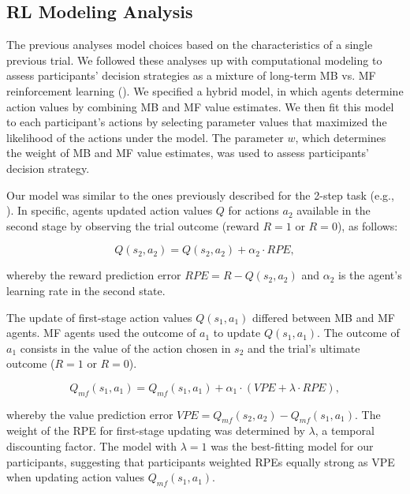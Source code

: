 \documentclass[11pt]{article} %
\begin{document}
\subsection{RL Modeling Analysis}
The previous analyses model choices based on the characteristics of a single previous trial. We followed these analyses up with computational modeling to assess participants' decision strategies as a mixture of long-term MB vs. MF reinforcement learning (\cite{sutton_reinforcement_2017}). We specified a hybrid model, in which agents determine action values by combining MB and MF value estimates. We then fit this model to each participant's actions by selecting parameter values that maximized the likelihood of the actions under the model. The parameter $w$, which determines the weight of MB and MF value estimates, was used to assess participants' decision strategy.

Our model was similar to the ones previously described for the 2-step task (e.g., \cite{wunderlich_dopamine_2012}). In specific, agents updated action values $Q$ for actions $a_{2}$ available in the second stage by observing the trial outcome (reward $R = 1$ or $R = 0$), as follows:

\begin{equation}
Q(s_{2}, a_{2}) = Q(s_{2}, a_{2}) + \alpha_{2} \cdot RPE,
\end{equation}

whereby the reward prediction error $RPE = R - Q(s_{2}, a_{2})$ and $\alpha_{2}$ is the agent's learning rate in the second state.

The update of first-stage action values $Q(s_{1}, a_{1})$ differed between MB and MF agents. MF agents used the outcome of $a_{1}$ to update $Q(s_{1}, a_{1})$. The outcome of $a_{1}$ consists in the value of the action chosen in $s_{2}$ and the trial's ultimate outcome ($R = 1$ or $R = 0$).

\begin{equation}
Q_{mf}(s_{1}, a_{1}) = Q_{mf}(s_{1}, a_{1}) + \alpha_{1} \cdot (VPE + \lambda \cdot RPE),
\end{equation}

whereby the value prediction error $VPE = Q_{mf}(s_{2}, a_{2}) - Q_{mf}(s_{1}, a_{1})$. The weight of the RPE for first-stage updating was determined by $ \lambda $, a temporal discounting factor. The model with $\lambda = 1$ was the best-fitting model for our participants, suggesting that participants weighted RPEs equally strong as VPE when updating action values $Q_{mf}(s_{1}, a_{1})$.
\end{document}
